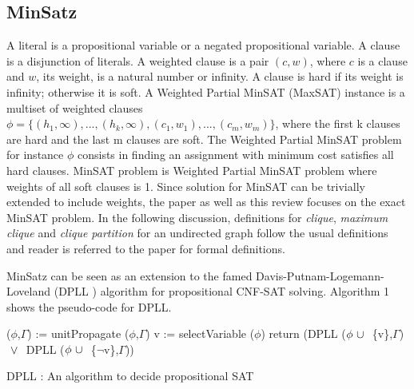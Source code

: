 \subsection{MinSatz}
A literal is a propositional variable or a negated propositional variable. A
clause is a disjunction of literals. A weighted clause is a pair $(c, w)$, where
$c$ is a clause and $w$, its weight, is a natural number or infinity. A clause is
hard if its weight is infinity; otherwise it is soft. A Weighted Partial MinSAT
(MaxSAT) instance is a multiset of weighted clauses $\phi =
\{(h_1,\infty),...,(h_k,\infty),(c_1, w_1),...,(c_m, w_m)\}$, where the ﬁrst k
clauses are hard and the last m clauses are soft. The Weighted Partial MinSAT
problem for instance $\phi$ consists in finding an assignment with minimum cost
satisfies all hard clauses. MinSAT problem is Weighted Partial MinSAT problem
where weights of all soft clauses is 1. Since solution for MinSAT can be
trivially extended to include weights, the paper as well as this review focuses
on the exact MinSAT problem. In the following discussion, definitions for
\emph{clique}, \emph{maximum clique} and \emph{clique partition} for an
undirected graph follow the usual definitions and reader is referred to the
paper for formal definitions.

MinSatz can be seen as an extension to the famed Davis-Putnam-Logemann-Loveland
(DPLL \cite{dpll}) algorithm for propositional CNF-SAT solving. Algorithm 1
shows the pseudo-code for DPLL. 
\begin{algorithm}
 \SetAlgoLined 
 ($\phi$,$\Gamma$) := unitPropagate ($\phi$,$\Gamma$)\;
  v := selectVariable ($\phi$)\;
  return (DPLL ($\phi ~\cup~ $ \{v\},$\Gamma$) $~\vee~$ 
          DPLL ($\phi ~\cup~ $ \{$\neg$v\},$\Gamma$))
 \caption{DPLL : An algorithm to decide propositional SAT}
\end{algorithm}
